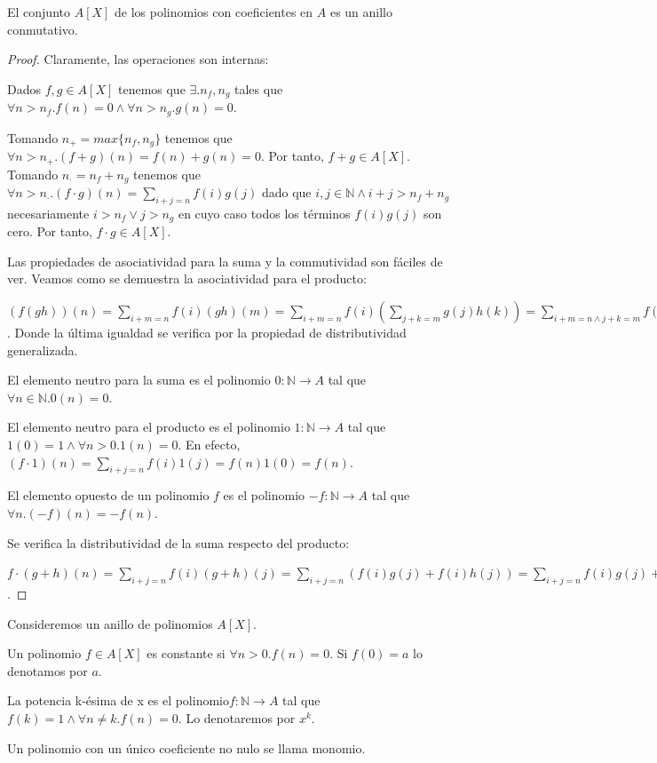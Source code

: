 \begin{proposition}
	El conjunto $A[X]$ de los polinomios con coeficientes en $A$ es un anillo conmutativo. 
\end{proposition}
\begin{proof}
	Claramente, las operaciones son internas:
	
	Dados $f,g \in A[X]$ tenemos que $\exists. n_f,n_g$ tales que $\forall n > n_f. f(n) = 0 \land \forall n > n_g. g(n) = 0$. 
	
	Tomando $n_+ = max\{n_f,n_g\}$ tenemos que $\forall n > n_+. (f+g)(n) = f(n)+g(n) = 0$. Por tanto, $f+g \in A[X]$. 
	Tomando $n_\cdot = n_f + n_g$ tenemos que $\forall n > n_\cdot. (f \cdot g)(n) = \sum_{i+j = n} f(i)g(j)$ dado que $i,j \in \mathbb{N} \land i+j > n_f + n_g$ necesariamente $i > n_f \lor j > n_g$ en cuyo caso todos los términos $f(i)g(j)$ son cero. Por tanto, $f \cdot g \in A[X]$. 
	
	Las propiedades de asociatividad para la suma y la commutividad son fáciles de ver. Veamos como se demuestra la asociatividad para el producto:
	
	$(f(gh))(n) = \sum_{i+m = n} f(i)(gh)(m) = \sum_{i+m = n} f(i) (\sum_{j+k = m} g(j)h(k)) = \sum_{i+m = n \land j+k = m} f(i)g(j)h(k) = \sum_{i+j+k = m} f(i)g(j)h(k)$. Donde la última igualdad se verifica por la propiedad de distributividad generalizada. 
	
	El elemento neutro para la suma es el polinomio $0: \mathbb{N} \to A$ tal que $\forall n \in \mathbb{N}. 0(n) = 0$. 
	
	El elemento neutro para el producto es el polinomio $1:\mathbb{N} \to A$ tal que $1(0) = 1 \land \forall n > 0. 1(n) = 0$. En efecto, $(f\cdot 1)(n) = \sum_{i+j = n} f(i)1(j) = f(n)1(0) = f(n)$. 
	
	El elemento opuesto de un polinomio $f$ es el polinomio $-f: \mathbb{N} \to A$ tal que $\forall n. (-f)(n) = -f(n)$. 
	
	Se verifica la distributividad de la suma respecto del producto:
	
	$f \cdot (g+h)(n) = \sum_{i+j = n} f(i) (g+h)(j) = \sum_{i+j = n} (f(i)g(j) + f(i)h(j)) = \sum_{i+j = n} f(i)g(j) + \sum_{i+j = n} f(i)h(j) = (f\cdot g + f \cdot h)(n)$.  
\end{proof}

\begin{definition}
	Consideremos un anillo de polinomios $A[X]$. 
	
	Un polinomio $f \in A[X]$ es constante si $\forall n > 0. f(n) = 0$. Si $f(0) = a$ lo denotamos por $a$. 
	
	La potencia k-ésima de x es el polinomio$f: \mathbb{N} \to A$ tal que $f(k) = 1 \land \forall n \neq k. f(n) = 0$. Lo denotaremos por $x^k$.  
	
	Un polinomio con un único coeficiente no nulo se llama monomio. 
\end{definition}

